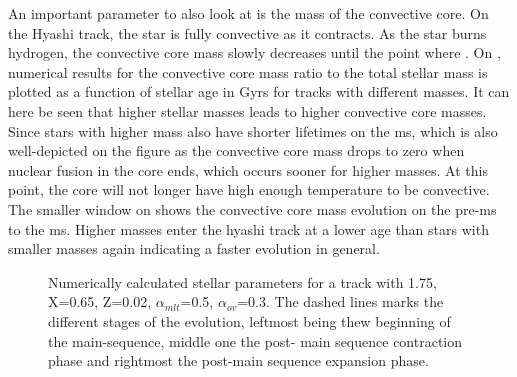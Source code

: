 An important parameter to also look at is the mass of the convective core. On the Hyashi track, the star is fully convective as it contracts. As the star burns hydrogen, the convective core mass slowly decreases until the point where .  On , numerical results for the convective core mass ratio to the total stellar mass is plotted as a function of stellar age in Gyrs for tracks with different masses. It can here be seen that higher stellar masses leads to higher convective core masses. Since stars with higher mass also have shorter lifetimes on the ms, which is also well-depicted on the figure as the convective core mass drops to zero when nuclear fusion in the core ends, which occurs sooner for higher masses. At this point, the core will not longer have high enough temperature to be convective. The smaller window on  shows the convective core mass evolution on the pre-ms to the ms. Higher masses enter the hyashi track at a lower age than stars with smaller masses again indicating a faster evolution in general.  

\begin{figure}[htbp]
    \centering
    \caption{Numerically calculated stellar parameters for a track with 1.75\msun, X=0.65, Z=0.02, $\alpha_{mlt}$=0.5, $\alpha_{ov}$=0.3. The dashed lines marks the different stages of the evolution, leftmost being thew beginning of the main-sequence, middle one the post- main sequence contraction phase and rightmost the post-main sequence expansion phase.}
    \label{stellarparams}
\end{figure}



